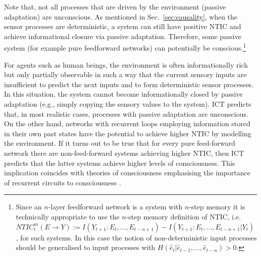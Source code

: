 \documentclass[utf8]{article}
\begin{document}
                Note that, not all processes that are driven by the environment (passive adaptation) are unconscious. As mentioned in Sec.~\ref{sec:causality}, when the sensor processes are deterministic, a system can still have positive NTIC and achieve informational closure via passive adaptation. Therefore, some passive system (for example pure feedforward networks) can potentially be conscious.\footnote{Since an $n$-layer feedforward network is a system with $n$-step memory it is technically appropriate to use the $n$-step memory definition of NTIC, i.e.~$NTIC^m_t(E\rightarrow Y):=I(Y_{t+1}:E_t,\dots,E_{t-n+1})-I(Y_{t+1}:E_t,\dots,E_{t-n+1}|Y_t)$ \citep{BERTSCHINGER.2006}, for such systems. In this case the notion of non-deterministic input processes should be generalised to input processes with $H(\hat{e}_t|\hat{e}_{t-1},\dots,\hat{e}_{t-n})>0$.}
                
                For agents such as human beings, the environment is often informationally rich but only partially observable in such a way that the current sensory inputs are insufficient to predict the next inputs and to form deterministic sensor processes. In this situation, the system cannot become informationally closed by passive adaptation (e.g., simply copying the sensory values to the system). ICT predicts that, in most realistic cases, processes with passive adaptation are unconscious. On the other hand, networks with recurrent loops employing information stored in their own past states have the potential to achieve higher NTIC by modelling the environment. If it turns out to be true that for every pure feed-forward network there are non-feed-forward systems achieving higher NTIC, then ICT predicts that the latter systems achieve higher levels of consciousness. This implication coincides with theories of consciousness emphasising the importance of recurrent circuits to consciousness \citep{lamme2006towards, edelman1992bright, tononi2008neural}.                
   
\end{document}
